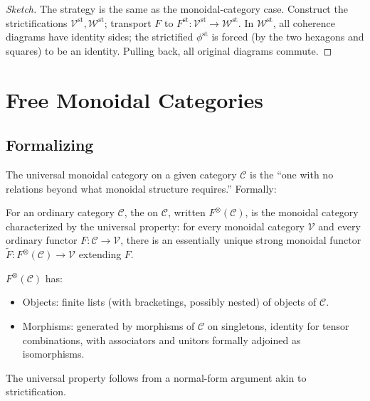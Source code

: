 \begin{proof}[Sketch]
The strategy is the same as the monoidal-category case. Construct the
strictifications $\mathcal{V}^{\mathrm{st}}, \mathcal{W}^{\mathrm{st}}$;
transport $F$ to $F^{\mathrm{st}} : \mathcal{V}^{\mathrm{st}} \to
\mathcal{W}^{\mathrm{st}}$. In $\mathcal{W}^{\mathrm{st}}$, all coherence
diagrams have identity sides; the strictified $\phi^{\mathrm{st}}$ is
forced (by the two hexagons and squares) to be an identity. Pulling back,
all original diagrams commute.
\end{proof}


\section{Free Monoidal Categories}
\label{sec:free-monoidal}

\subsection{Formalizing}

The universal monoidal category on a given category $\mathcal{C}$ is the
``one with no relations beyond what monoidal structure requires.'' Formally:

\begin{definition}
\label{def:free-monoidal}
For an ordinary category $\mathcal{C}$, the  on
$\mathcal{C}$, written $F^\otimes(\mathcal{C})$, is the monoidal category
characterized by the universal property: for every monoidal category
$\mathcal{V}$ and every ordinary functor $F : \mathcal{C} \to \mathcal{V}$,
there is an essentially unique strong monoidal functor $\widetilde F :
F^\otimes(\mathcal{C}) \to \mathcal{V}$ extending $F$.
\end{definition}

\begin{theorem}[Construction]
\label{thm:free-monoidal-construction}
$F^\otimes(\mathcal{C})$ has:
\begin{itemize}
  \item Objects: finite lists (with bracketings, possibly nested) of objects of $\mathcal{C}$.
  \item Morphisms: generated by morphisms of $\mathcal{C}$ on singletons,
        identity for tensor combinations, with associators and unitors
        formally adjoined as isomorphisms.
\end{itemize}
The universal property follows from a normal-form argument akin to
strictification.
\end{theorem}

